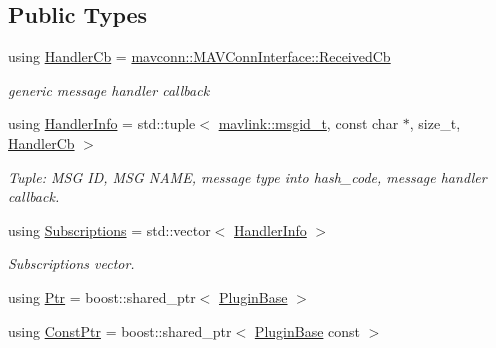 \subsection*{Public Types}
\begin{DoxyCompactItemize}
\item 
using \mbox{\hyperlink{group__plugin_ga51d7c95b43e74aa68c80ebe6b171e383}{Handler\+Cb}} = \mbox{\hyperlink{group__mavconn_ga1d04ead963f1685f3aaf4b18ffb49ff7}{mavconn\+::\+M\+A\+V\+Conn\+Interface\+::\+Received\+Cb}}
\begin{DoxyCompactList}\small\item\em generic message handler callback \end{DoxyCompactList}\item 
using \mbox{\hyperlink{group__plugin_gab973eb02b8f26a7b2b9cea37924317f1}{Handler\+Info}} = std\+::tuple$<$ \mbox{\hyperlink{namespacemavlink_a98a1fe49b380ed1ea252d2c13bf3278d}{mavlink\+::msgid\+\_\+t}}, const char $\ast$, size\+\_\+t, \mbox{\hyperlink{group__plugin_ga51d7c95b43e74aa68c80ebe6b171e383}{Handler\+Cb}} $>$
\begin{DoxyCompactList}\small\item\em Tuple\+: M\+SG ID, M\+SG N\+A\+ME, message type into hash\+\_\+code, message handler callback. \end{DoxyCompactList}\item 
using \mbox{\hyperlink{group__plugin_ga8967d61fc77040e0c3ea5a4585d62a09}{Subscriptions}} = std\+::vector$<$ \mbox{\hyperlink{group__plugin_gab973eb02b8f26a7b2b9cea37924317f1}{Handler\+Info}} $>$
\begin{DoxyCompactList}\small\item\em Subscriptions vector. \end{DoxyCompactList}\item 
using \mbox{\hyperlink{group__plugin_ga61d4cf3cc97503da0157ead2ac68dc47}{Ptr}} = boost\+::shared\+\_\+ptr$<$ \mbox{\hyperlink{classmavros_1_1plugin_1_1PluginBase}{Plugin\+Base}} $>$
\item 
using \mbox{\hyperlink{group__plugin_gaba13f33fe0f830b90b51bbe2d168f683}{Const\+Ptr}} = boost\+::shared\+\_\+ptr$<$ \mbox{\hyperlink{classmavros_1_1plugin_1_1PluginBase}{Plugin\+Base}} const  $>$
\end{DoxyCompactItemize}
